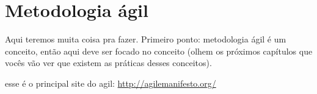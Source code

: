 \chapter{Metodologia ágil}

Aqui teremos muita coisa pra fazer. Primeiro ponto: metodologia ágil
é um conceito, então aqui deve ser focado no conceito (olhem os próximos
capítulos que vocês vão ver que existem as práticas desses conceitos).

esse é o principal site do agil: \url{http://agilemanifesto.org/}
